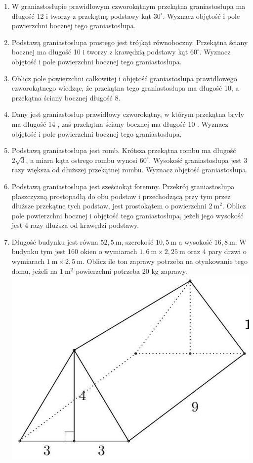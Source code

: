 \documentclass[10pt]{article}
\begin{document}
\begin{enumerate}
  \item W graniastosłupie prawidłowym czworokątnym przekątna graniastosłupa ma długość 12 i tworzy z przekątną podstawy kąt \(30^{\circ}\). Wyznacz objętość i pole powierzchni bocznej tego graniastosłupa.
  \item Podstawą graniastosłupa prostego jest trójkąt równoboczny. Przekątna ściany bocznej ma długość 10 i tworzy z krawędzią podstawy kąt \(60^{\circ}\). Wyznacz objętość i pole powierzchni bocznej tego graniastosłupa.
  \item Oblicz pole powierzchni całkowitej i objętość graniastosłupa prawidłowego czworokątnego wiedząc, że przekątna tego graniastosłupa ma długość 10, a przekątna ściany bocznej długość 8.
  \item Dany jest graniastosłup prawidłowy czworokątny, w którym przekątna bryły ma długość 14 , zaś przekątna ściany bocznej ma długość 10 . Wyznacz objętość i pole powierzchni bocznej tego graniastosłupa.
  \item Podstawą graniastosłupa jest romb. Krótsza przekątna rombu ma długość \(2 \sqrt{3}\), a miara kąta ostrego rombu wynosi \(60^{\circ}\). Wysokość graniastosłupa jest 3 razy większa od dłuższej przekątnej rombu. Wyznacz objętość graniastosłupa.
  \item Podstawą graniastosłupa jest sześciokąt foremny. Przekrój graniastosłupa płaszczyzną prostopadłą do obu podstaw i przechodzącą przy tym przez dłuższe przekątne tych podstaw, jest prostokątem o powierzchni \(2 \mathrm{~m}^{2}\). Oblicz pole powierzchni bocznej i objętość tego graniastosłupa, jeżeli jego wysokość jest 4 razy dłuższa od krawędzi podstawy.
  \item Długość budynku jest równa \(52,5 \mathrm{~m}\), szerokość \(10,5 \mathrm{~m}\) a wysokość \(16,8 \mathrm{~m}\). W budynku tym jest 160 okien o wymiarach \(1,6 \mathrm{~m} \times 2,25 \mathrm{~m}\) oraz 4 pary drzwi o wymiarach \(1 \mathrm{~m} \times 2,5 \mathrm{~m}\). Oblicz ile ton zaprawy potrzeba na otynkowanie tego domu, jeżeli na \(1 \mathrm{~m}^{2}\) powierzchni potrzeba 20 kg zaprawy.\\
\includegraphics[max width=\textwidth, center]{2024_11_21_e9b4faa005d5be2cc318g-080(1)}

\end{enumerate}
\end{document}

